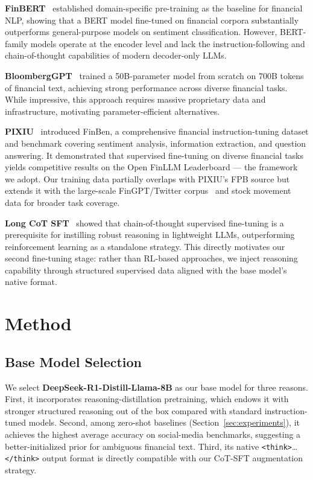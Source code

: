 \documentclass[11pt,letterpaper]{article}
\begin{document}
\textbf{FinBERT}~\cite{araci2019finbert} established domain-specific
pre-training as the baseline for financial NLP, showing that a BERT model
fine-tuned on financial corpora substantially outperforms general-purpose
models on sentiment classification.
However, BERT-family models operate at the encoder level and lack the
instruction-following and chain-of-thought capabilities of modern
decoder-only LLMs.

\textbf{BloombergGPT}~\cite{wu2023bloomberggpt} trained a 50B-parameter
model from scratch on 700B tokens of financial text, achieving strong
performance across diverse financial tasks.
While impressive, this approach requires massive proprietary data and
infrastructure, motivating parameter-efficient alternatives.

\textbf{PIXIU}~\cite{xie2023pixiu} introduced FinBen, a comprehensive
financial instruction-tuning dataset and benchmark covering sentiment
analysis, information extraction, and question answering.
It demonstrated that supervised fine-tuning on diverse financial tasks
yields competitive results on the Open FinLLM Leaderboard --- the
framework we adopt.
Our training data partially overlaps with PIXIU's FPB source but
extends it with the large-scale FinGPT/Twitter corpus~\cite{wang2023fingpt}
and stock movement data for broader task coverage.

\textbf{Long CoT SFT}~\cite{ou2025cot} showed that chain-of-thought
supervised fine-tuning is a prerequisite for instilling robust reasoning
in lightweight LLMs, outperforming reinforcement learning as a standalone
strategy.
This directly motivates our second fine-tuning stage: rather than RL-based
approaches, we inject reasoning capability through structured supervised
data aligned with the base model's native format.

\section{Method}
\label{sec:method}

\subsection{Base Model Selection}

We select \textbf{DeepSeek-R1-Distill-Llama-8B} as our base model for
three reasons.
First, it incorporates reasoning-distillation pretraining, which endows
it with stronger structured reasoning out of the box compared with
standard instruction-tuned models.
Second, among zero-shot baselines (Section~\ref{sec:experiments}),
it achieves the highest average accuracy on social-media benchmarks,
suggesting a better-initialized prior for ambiguous financial text.
Third, its native \texttt{<think>}\ldots\texttt{</think>} output format
is directly compatible with our CoT-SFT augmentation strategy.
\end{document}
